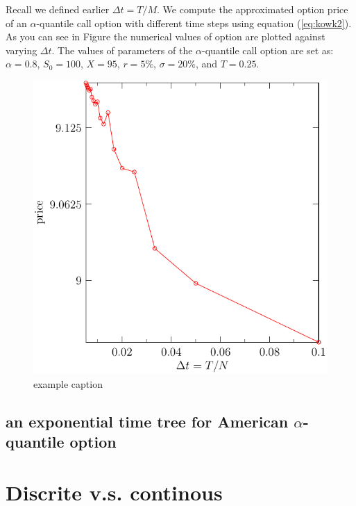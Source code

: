 \documentclass[11pt]{book}
\begin{document}
Recall we defined earlier $\Delta t = T / M$. We compute the approximated option price of an $\alpha$-quantile call option with different time steps using equation (\ref{eq:kowk2}). As you can see in Figure %
the numerical values of option are plotted against varying $\Delta t$. The values of parameters of the $\alpha$-quantile call option are set as: $ \alpha = 0.8$, $S_0 = 100$, $X = 95$, $r = 5\%$, $\sigma = 20\%$, and $T = 0.25$.
\begin{figure}[htbp]
   \centering
   \includegraphics{bfsg.pdf} %
   \caption{example caption}
   \label{fig:2}
\end{figure}


\subsection{ an exponential time tree for American $\alpha$-quantile option}













\section{Discrite v.s. continous}
\end{document}
